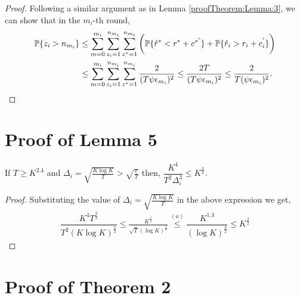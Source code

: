 \begin{proof}
Following a similar argument as in Lemma \ref{proofTheorem:Lemma:3}, we can show that in the $m_i$-th round,
\begin{align*}
\mathbb{P}\lbrace z_i > n_{m_i} \rbrace &\leq \sum_{m=0}^{m_i}\sum_{z_i =1}^{n_{m_i}}\sum_{z^* =1}^{n_{m_i}}\bigg(\mathbb{P}\lbrace \hat{r}^* < r^* + c^{*'}\rbrace + \mathbb{P}\lbrace \hat{r}_i > r_i + c_i^{'}\rbrace\bigg) \\
&\leq \sum_{m=0}^{m_i}\sum_{z_i =1}^{n_{m_i}}\sum_{z^* =1}^{n_{m_i}} \dfrac{2}{(T\psi \epsilon_{m_i})^2} \leq \dfrac{2 T}{(T\psi \epsilon_{m_i})^2}\leq  \dfrac{2}{T(\psi \epsilon_{m_i})^2}.
\end{align*}
\end{proof}

\section{Proof of Lemma 5}
\label{App:Lemma5}
\begin{lemma}
\label{proofTheorem:Lemma:5}
If $T\geq K^{2.4}$ and $	\Delta_{i}=\sqrt{\frac{K\log K}{T}} > \sqrt{\frac{e}{T}}$ then, $\dfrac{K^4}{T^2 \Delta_i^3} \leq K^{\frac{3}{2}}$.
\end{lemma}

\begin{proof}
Substituting the value of $\Delta_{i}=\sqrt{\frac{K\log K}{T}}$ in the above expression we get,
\begin{align*}
\dfrac{K^4 T^{\frac{3}{2}}}{T^2 (K\log K)^{\frac{3}{2}}} \leq \frac{K^{\frac{5}{2}}}{\sqrt{T}(\log K)^{\frac{3}{2}}} \overset{(a)}{\leq} \dfrac{K^{1.3}}{(\log K)^{\frac{3}{2}}} \leq K^{\frac{3}{2}}
\end{align*}  
\end{proof}


\section{Proof of Theorem 2}
\label{sec:proofTheorem2}
